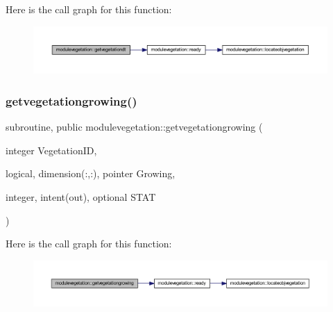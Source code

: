 Here is the call graph for this function\+:\nopagebreak
\begin{figure}[H]
\begin{center}
\leavevmode
\includegraphics[width=350pt]{namespacemodulevegetation_a357b84bec55907c71de65f8c878020f2_cgraph}
\end{center}
\end{figure}
\mbox{\label{namespacemodulevegetation_ad0a29b6dd966a910007e5e5268c1bb4a}} 
\subsubsection{\texorpdfstring{getvegetationgrowing()}{getvegetationgrowing()}}
{\footnotesize\ttfamily subroutine, public modulevegetation\+::getvegetationgrowing (\begin{DoxyParamCaption}\item[{integer}]{Vegetation\+ID,  }\item[{logical, dimension(\+:,\+:), pointer}]{Growing,  }\item[{integer, intent(out), optional}]{S\+T\+AT }\end{DoxyParamCaption})}

Here is the call graph for this function\+:\nopagebreak
\begin{figure}[H]
\begin{center}
\leavevmode
\includegraphics[width=350pt]{namespacemodulevegetation_ad0a29b6dd966a910007e5e5268c1bb4a_cgraph}
\end{center}
\end{figure}
\mbox{\label{namespacemodulevegetation_a95ec1a8e366b1743687f4824f5ac8672}} 
